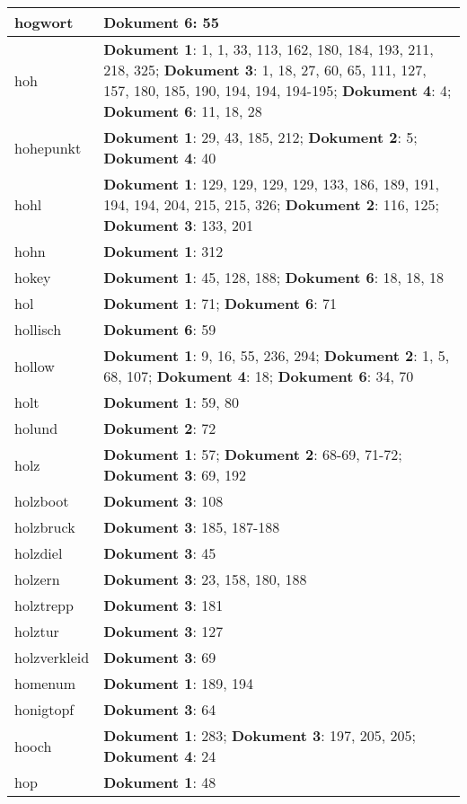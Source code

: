 \documentclass[a5paper]{article}
\begin{document}
\begin{longtable}[l]{|l|p{3in}|}
\hline
hogwort & \textbf{Dokument 6}: 55 \\
\hline
hoh & \textbf{Dokument 1}: 1, 1, 33, 113, 162, 180, 184, 193, 211, 218, 325; \textbf{Dokument 3}: 1, 18, 27, 60, 65, 111, 127, 157, 180, 185, 190, 194, 194, 194-195; \textbf{Dokument 4}: 4; \textbf{Dokument 6}: 11, 18, 28 \\
\hline
hohepunkt & \textbf{Dokument 1}: 29, 43, 185, 212; \textbf{Dokument 2}: 5; \textbf{Dokument 4}: 40 \\
\hline
hohl & \textbf{Dokument 1}: 129, 129, 129, 129, 133, 186, 189, 191, 194, 194, 204, 215, 215, 326; \textbf{Dokument 2}: 116, 125; \textbf{Dokument 3}: 133, 201 \\
\hline
hohn & \textbf{Dokument 1}: 312 \\
\hline
hokey & \textbf{Dokument 1}: 45, 128, 188; \textbf{Dokument 6}: 18, 18, 18 \\
\hline
hol & \textbf{Dokument 1}: 71; \textbf{Dokument 6}: 71 \\
\hline
hollisch & \textbf{Dokument 6}: 59 \\
\hline
hollow & \textbf{Dokument 1}: 9, 16, 55, 236, 294; \textbf{Dokument 2}: 1, 5, 68, 107; \textbf{Dokument 4}: 18; \textbf{Dokument 6}: 34, 70 \\
\hline
holt & \textbf{Dokument 1}: 59, 80 \\
\hline
holund & \textbf{Dokument 2}: 72 \\
\hline
holz & \textbf{Dokument 1}: 57; \textbf{Dokument 2}: 68-69, 71-72; \textbf{Dokument 3}: 69, 192 \\
\hline
holzboot & \textbf{Dokument 3}: 108 \\
\hline
holzbruck & \textbf{Dokument 3}: 185, 187-188 \\
\hline
holzdiel & \textbf{Dokument 3}: 45 \\
\hline
holzern & \textbf{Dokument 3}: 23, 158, 180, 188 \\
\hline
holztrepp & \textbf{Dokument 3}: 181 \\
\hline
holztur & \textbf{Dokument 3}: 127 \\
\hline
holzverkleid & \textbf{Dokument 3}: 69 \\
\hline
homenum & \textbf{Dokument 1}: 189, 194 \\
\hline
honigtopf & \textbf{Dokument 3}: 64 \\
\hline
hooch & \textbf{Dokument 1}: 283; \textbf{Dokument 3}: 197, 205, 205; \textbf{Dokument 4}: 24 \\
\hline
hop & \textbf{Dokument 1}: 48 \\

\end{longtable}
\end{document}
